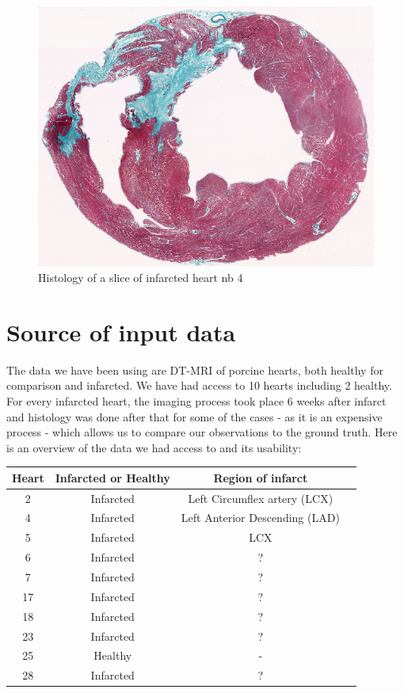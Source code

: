 \begin{figure}[h!]
    \centering
    \includegraphics[width=\textwidth]{figures/Gip4_histology}
    \caption{Histology of a slice of infarcted heart nb 4}
    \label{fig:histology_pig_4}
\end{figure}

\section{Source of input data}

The data we have been using are DT-MRI of porcine hearts, both healthy for comparison and infarcted. We have had access to 10 hearts including 2 healthy. For every infarcted heart, the imaging process took place 6 weeks after infarct and histology was done after that for some of the cases - as it is an expensive process - which allows us to compare our observations to the ground truth. Here is an overview of the data we had access to and its usability:

\begin{center}
 \begin{tabular}{|c | c | c | c|} 
 \hline
 Heart & Infarcted or Healthy & Region of infarct \\
 \hline
 2 & Infarcted & Left Circumflex artery (LCX) \\ 
 \hline
 4 & Infarcted & Left Anterior Descending (LAD) \\
 \hline
 5 & Infarcted & LCX \\
 \hline
 6 & Infarcted & ? \\
 \hline
 7 & Infarcted & ? \\ 
 \hline
 17 & Infarcted & ? \\
 \hline
 18 & Infarcted & ? \\
 \hline
 23 & Infarcted & ? \\
 \hline
 25 & Healthy & - \\
 \hline
 28 & Infarcted & ? \\
 \hline
\end{tabular}
\end{center}

